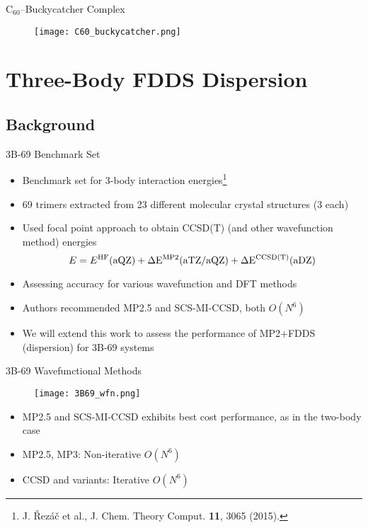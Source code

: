 \documentclass{beamer}
\begin{document}
        \begin{frame}{C$_{60}$--Buckycatcher Complex}
            \begin{figure}
                \centering
                \texttt{[image: C60\_buckycatcher.png]}
            \end{figure}
        \end{frame}

\section{Three-Body FDDS Dispersion}

    \subsection{Background}
    
        \begin{frame}{3B-69 Benchmark Set}
            \begin{itemize}
                \item Benchmark set for 3-body interaction energies\footnote{J. \v{R}ez\'{a}\v{c} et al., J. Chem. Theory Comput. \textbf{11}, 3065 (2015).}
                \item 69 trimers extracted from 23 different molecular crystal structures (3 each)
                \item Used focal point approach to obtain CCSD(T) (and other wavefunction method) energies
                $$E = E^{\rm{HF}}(\rm{aQZ}) + \Delta E^{\rm{MP2}}(\rm{aTZ/aQZ}) + \Delta E^{\rm{CCSD(T)}}(\rm{aDZ}) $$   
                \item Assessing accuracy for various wavefunction and DFT methods 
                \item Authors recommended MP2.5 and SCS-MI-CCSD, both $O(N^6)$
                \item We will extend this work to assess the performance of MP2+FDDS (dispersion) for 3B-69 systems
            \end{itemize}   
        \end{frame}

        \begin{frame}{3B-69 Wavefunctional Methods}
            \begin{figure}
                \centering
                \texttt{[image: 3B69\_wfn.png]}
            \end{figure}
            \begin{itemize}
                \item MP2.5 and SCS-MI-CCSD exhibits best cost performance, as in the two-body case
                \item MP2.5, MP3: Non-iterative $O(N^6)$
                \item CCSD and variants: Iterative $O(N^6)$
            \end{itemize}
        \end{frame}
\end{document}
